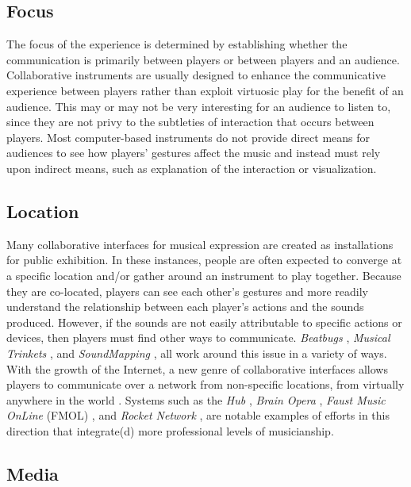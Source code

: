 \subsection{Focus}

The focus of the experience is determined by establishing whether the
communication is primarily between players or between players and an audience.
Collaborative instruments are usually designed to enhance the communicative
experience between players rather than exploit virtuosic play for the benefit of
an audience. This may or may not be very interesting for an audience to listen
to, since they are not privy to the subtleties of interaction that occurs between
players. Most computer-based instruments do not provide direct means for
audiences to see how players' gestures affect the music and instead must rely
upon indirect means, such as explanation of the interaction or visualization.

\subsection{Location}

Many collaborative interfaces for musical expression are created as
installations for public exhibition.  In these instances, people are often
expected to converge at a specific location and/or gather around an instrument to
play together.  Because they are co-located, players can see each other's
gestures and more readily understand the relationship between each player's
actions and the sounds produced. However, if the sounds are not easily
attributable to specific actions or devices, then players must find other ways to
communicate.  \textit{Beatbugs }  \cite{Weinberg:2002a}, \textit{Musical Trinkets } \cite{Paradiso:2001},
and\textit{ SoundMapping} \cite{Mott:1997},  all work around this issue in a variety of ways.
 With the growth of the Internet, a new genre of collaborative interfaces allows
players to communicate over a network from non-specific locations, from virtually
anywhere in the world \cite{Weinberg:2002}.  Systems such as the \textit{Hub} \cite{Gresham-Lancaster:1998}, \textit{Brain
Opera} \cite{Machover:1996,Paradiso:1999},\textit{ Faust Music OnLine} (FMOL) \cite{Jorda:1999}, and \textit{Rocket
Network} \cite{Hall:2002}, are notable examples of efforts in this direction that
integrate(d) more professional levels of musicianship.

\subsection{Media}

